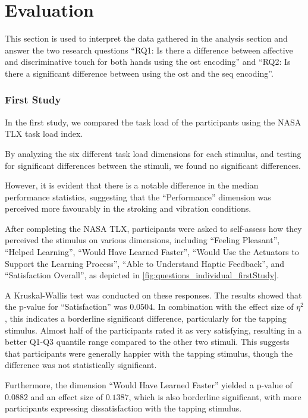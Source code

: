 \chapter{Evaluation}
\label{ch:Evaluation}

This section is used to interpret the data gathered in the analysis section and answer the two research questions \enquote{RQ1: Is there a difference between affective and discriminative touch for
both hands using the \gls{ost} encoding} and
\enquote{RQ2: Is there a significant
difference between using the \gls{ost} and the \gls{seq} encoding}.


\subsection{First Study}
In the first study, we compared the task load of the participants using the NASA TLX task load index. 

By analyzing the six different task load dimensions for each stimulus, and testing for significant differences between the stimuli, we found no significant differences. 

However, it is evident that there is a notable difference in the median performance statistics, suggesting that the \enquote{Performance} dimension was perceived more favourably in the stroking and vibration conditions.

After completing the NASA TLX, participants were asked to self-assess how they perceived the stimulus on various dimensions, including \enquote{Feeling Pleasant}, \enquote{Helped Learning}, \enquote{Would Have Learned Faster}, \enquote{Would Use the Actuators to Support the Learning Process}, \enquote{Able to Understand Haptic Feedback}, and \enquote{Satisfaction Overall}, as depicted in \autoref{fig:questions_individual_firstStudy}.

A Kruskal-Wallis test was conducted on these responses. The results showed that the p-value for \enquote{Satisfaction} was $0.0504$. In combination with the effect size of $\eta^2$, this indicates a borderline significant difference, particularly for the tapping stimulus. Almost half of the participants rated it as very satisfying, resulting in a better Q1-Q3 quantile range compared to the other two stimuli. This suggests that participants were generally happier with the tapping stimulus, though the difference was not statistically significant.

Furthermore, the dimension \enquote{Would Have Learned Faster} yielded a p-value of $0.0882$ and an effect size of $0.1387$, which is also borderline significant, with more participants expressing dissatisfaction with the tapping stimulus.


